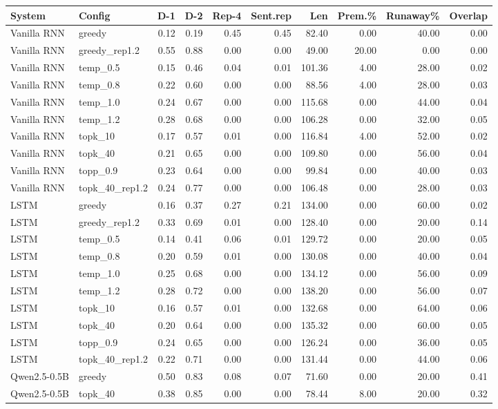 \begin{tabular}{llrrrrrrrr}
\toprule
System & Config & D-1 & D-2 & Rep-4 & Sent.rep & Len & Prem.\% & Runaway\% & Overlap \\
\midrule
Vanilla RNN & greedy & 0.12 & 0.19 & 0.45 & 0.45 & 82.40 & 0.00 & 40.00 & 0.00 \\
Vanilla RNN & greedy\_rep1.2 & 0.55 & 0.88 & 0.00 & 0.00 & 49.00 & 20.00 & 0.00 & 0.00 \\
Vanilla RNN & temp\_0.5 & 0.15 & 0.46 & 0.04 & 0.01 & 101.36 & 4.00 & 28.00 & 0.02 \\
Vanilla RNN & temp\_0.8 & 0.22 & 0.60 & 0.00 & 0.00 & 88.56 & 4.00 & 28.00 & 0.03 \\
Vanilla RNN & temp\_1.0 & 0.24 & 0.67 & 0.00 & 0.00 & 115.68 & 0.00 & 44.00 & 0.04 \\
Vanilla RNN & temp\_1.2 & 0.28 & 0.68 & 0.00 & 0.00 & 106.28 & 0.00 & 32.00 & 0.05 \\
Vanilla RNN & topk\_10 & 0.17 & 0.57 & 0.01 & 0.00 & 116.84 & 4.00 & 52.00 & 0.02 \\
Vanilla RNN & topk\_40 & 0.21 & 0.65 & 0.00 & 0.00 & 109.80 & 0.00 & 56.00 & 0.04 \\
Vanilla RNN & topp\_0.9 & 0.23 & 0.64 & 0.00 & 0.00 & 99.84 & 0.00 & 40.00 & 0.03 \\
Vanilla RNN & topk\_40\_rep1.2 & 0.24 & 0.77 & 0.00 & 0.00 & 106.48 & 0.00 & 28.00 & 0.03 \\
LSTM & greedy & 0.16 & 0.37 & 0.27 & 0.21 & 134.00 & 0.00 & 60.00 & 0.02 \\
LSTM & greedy\_rep1.2 & 0.33 & 0.69 & 0.01 & 0.00 & 128.40 & 0.00 & 20.00 & 0.14 \\
LSTM & temp\_0.5 & 0.14 & 0.41 & 0.06 & 0.01 & 129.72 & 0.00 & 20.00 & 0.05 \\
LSTM & temp\_0.8 & 0.20 & 0.59 & 0.01 & 0.00 & 130.08 & 0.00 & 40.00 & 0.04 \\
LSTM & temp\_1.0 & 0.25 & 0.68 & 0.00 & 0.00 & 134.12 & 0.00 & 56.00 & 0.09 \\
LSTM & temp\_1.2 & 0.28 & 0.72 & 0.00 & 0.00 & 138.20 & 0.00 & 56.00 & 0.07 \\
LSTM & topk\_10 & 0.16 & 0.57 & 0.01 & 0.00 & 132.68 & 0.00 & 64.00 & 0.06 \\
LSTM & topk\_40 & 0.20 & 0.64 & 0.00 & 0.00 & 135.32 & 0.00 & 60.00 & 0.05 \\
LSTM & topp\_0.9 & 0.24 & 0.65 & 0.00 & 0.00 & 126.24 & 0.00 & 36.00 & 0.05 \\
LSTM & topk\_40\_rep1.2 & 0.22 & 0.71 & 0.00 & 0.00 & 131.44 & 0.00 & 44.00 & 0.06 \\
Qwen2.5-0.5B & greedy & 0.50 & 0.83 & 0.08 & 0.07 & 71.60 & 0.00 & 20.00 & 0.41 \\
Qwen2.5-0.5B & topk\_40 & 0.38 & 0.85 & 0.00 & 0.00 & 78.44 & 8.00 & 20.00 & 0.32 \\
\bottomrule
\end{tabular}
